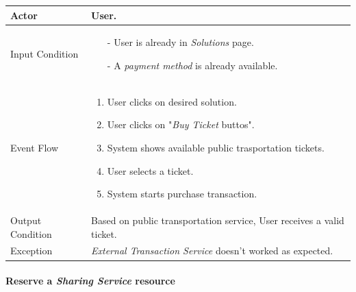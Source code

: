 		\begin{tabular}{| l | p{} | }
			\hline
			\hline
			Actor	&		User. \\
			\hline
			Input Condition		&		\begin{itemize}
													\item[-] User is already in \textit{Solutions} page.
													\item[-] A \textit{payment method} is already available.
												\end{itemize} \\
			\hline
			Event Flow		&		\begin{enumerate}
												\item User clicks on desired solution.
												\item User clicks on "\textit{Buy Ticket} buttos".
												\item System shows available public trasportation tickets.
												\item User selects a ticket.
												\item	 System starts purchase transaction.
											\end{enumerate} \\
			\hline
			Output Condition		&		Based on public transportation service, User receives a valid ticket. \\
			\hline		
			Exception		&		\textit{External Transaction Service} doesn't worked as expected. \\
			\hline
			\hline
		\end{tabular}


	\paragraph{Reserve a \textit{Sharing Service} resource}
	
